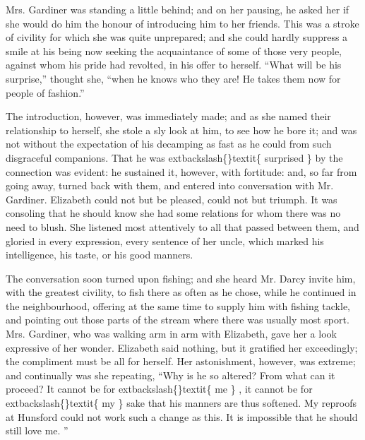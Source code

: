 \documentclass[10pt]{book}
\begin{document}
   Mrs. Gardiner was standing a little behind; and on her pausing, he asked
her if she would do him the honour of introducing him to her friends.
This was a stroke of civility for which she was quite unprepared; and
she could hardly suppress a smile at his being now seeking the
acquaintance of some of those very people, against whom his pride had
revolted, in his offer to herself. “What will be his surprise,” thought
she, “when he
   knows who they are! He takes them now for people of
fashion.”
  

   The introduction, however, was immediately made; and as she named their
relationship to herself, she stole a sly look at him, to see how he bore
it; and was not without the expectation of his decamping as fast as he
could from such disgraceful companions. That he was
   	extbackslash\{\}textit\{
    surprised
   \}
   by the
connection was evident: he sustained it, however, with fortitude: and,
so far from going away, turned back with them, and entered into
conversation with Mr. Gardiner. Elizabeth could not but be pleased,
could not but triumph. It was consoling that he should know she had some
relations for whom there was no need to blush. She listened most
attentively to all that passed between them, and gloried in every
expression, every sentence of her uncle, which marked his intelligence,
his taste, or his good manners.
  

   The conversation soon turned upon fishing; and she heard Mr. Darcy
invite him, with the greatest civility, to fish there as often as he
chose, while he continued in the neighbourhood, offering at the same
time to supply him with fishing tackle, and pointing out those parts of
the stream where there was usually most sport. Mrs. Gardiner, who was
walking arm in arm with Elizabeth, gave her a look expressive of her
wonder. Elizabeth said nothing, but it gratified her exceedingly; the
compliment must be all for herself. Her astonishment, however, was
extreme; and continually was she repeating, “Why is he so altered? From
what can it proceed? It cannot be for
   	extbackslash\{\}textit\{
    me
   \}
   , it cannot be for
   	extbackslash\{\}textit\{
    my
   \}
   sake
that his manners are thus softened. My reproofs at Hunsford could not
work such a change as this. It is impossible that he should still love
me.
   ”
  
\end{document}
